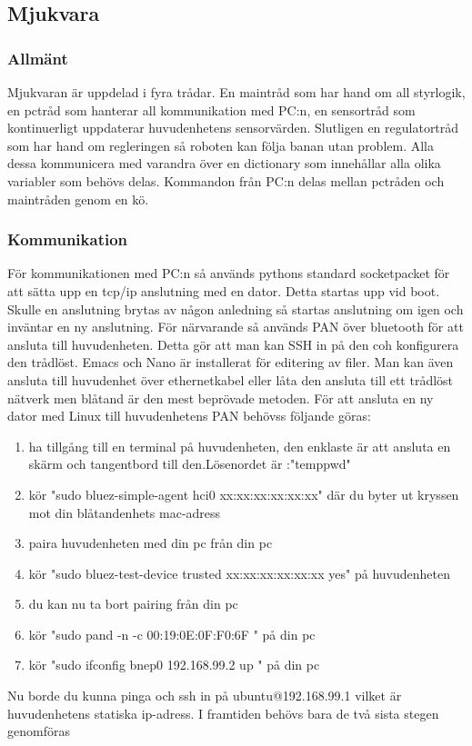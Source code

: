 \subsection{Mjukvara}
\subsubsection{Allmänt}
Mjukvaran är uppdelad i fyra trådar. En maintråd som har hand om all styrlogik, en pctråd som hanterar all kommunikation med PC:n, en sensortråd som kontinuerligt uppdaterar huvudenhetens sensorvärden. Slutligen en regulatortråd som har hand om regleringen så roboten kan följa banan utan problem. Alla dessa kommunicera med varandra över en dictionary som innehållar alla olika variabler som behövs delas. Kommandon från PC:n delas mellan pctråden och maintråden genom en kö.
\subsubsection{Kommunikation}
För kommunikationen med PC:n så används pythons standard socketpacket för att sätta upp en tcp/ip anslutning med en dator. Detta startas upp vid boot. Skulle en anslutning brytas av någon anledning så startas anslutning om igen och inväntar en ny anslutning. För närvarande så används PAN över bluetooth för att ansluta till huvudenheten. Detta gör att man kan SSH in på den coh konfigurera den trådlöst. Emacs och Nano är installerat för editering av filer. Man kan även ansluta till huvudenhet över ethernetkabel eller låta den ansluta till ett trådlöst nätverk men blåtand är den mest beprövade metoden. För att ansluta en ny dator med Linux till huvudenhetens PAN behövss följande göras:
\begin{enumerate}
\item ha tillgång till en terminal på huvudenheten, den enklaste är att ansluta en skärm och tangentbord till den.\newline Lösenordet är :"temppwd"
\item kör "sudo bluez-simple-agent hci0 xx:xx:xx:xx:xx:xx" där du byter ut kryssen mot din blåtandenhets mac-adress
\item paira huvudenheten med din pc från din pc
\item  kör "sudo bluez-test-device trusted xx:xx:xx:xx:xx:xx yes" på huvudenheten
\item du kan nu ta bort pairing från din pc
\item kör "sudo pand -n -c 00:19:0E:0F:F0:6F	" på din pc
\item kör "sudo ifconfig bnep0 192.168.99.2 up " på din pc
\end{enumerate}
Nu borde du kunna pinga och ssh in på ubuntu@192.168.99.1 vilket är huvudenhetens statiska ip-adress. I framtiden behövs bara de två sista stegen genomföras

